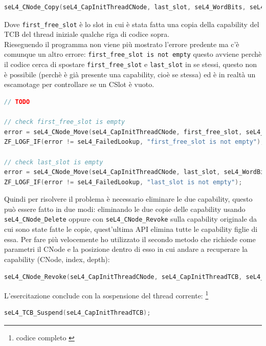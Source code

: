 \begin{lstlisting}[language=C++]
seL4_CNode_Copy(seL4_CapInitThreadCNode, last_slot, seL4_WordBits, seL4_CapInitThreadCNode, first_free_slot, seL4_WordBits, seL4_AllRights);
\end{lstlisting}
Dove \texttt{first\_free\_slot} è lo slot in cui è stata fatta una copia della capability del TCB del thread iniziale qualche riga di codice sopra.\\
Rieseguendo il programma non viene più mostrato l'errore predente ma c'è comunque un altro errore: \texttt{first\_free\_slot is not empty} questo avviene perchè il codice cerca di spostare \texttt{first\_free\_slot} e \texttt{last\_slot} in se stessi, questo non è possibile (perchè è già presente una capability, cioè se stessa) ed è in realtà un escamotage per controllare se un CSlot è vuoto.
\begin{lstlisting}[language=C++]
// TODO 
         
// check first_free_slot is empty
error = seL4_CNode_Move(seL4_CapInitThreadCNode, first_free_slot, seL4_WordBits, seL4_CapInitThreadCNode, first_free_slot, seL4_WordBits);
ZF_LOGF_IF(error != seL4_FailedLookup, "first_free_slot is not empty");

// check last_slot is empty
error = seL4_CNode_Move(seL4_CapInitThreadCNode, last_slot, seL4_WordBits, seL4_CapInitThreadCNode, last_slot, seL4_WordBits);
ZF_LOGF_IF(error != seL4_FailedLookup, "last_slot is not empty");
\end{lstlisting}
Quindi per risolvere il problema è necessario eliminare le due capability, questo può essere fatto in due modi: eliminando le due copie delle capability usando \texttt{seL4\_CNode\_Delete} oppure con \texttt{seL4\_CNode\_Revoke} sulla capability originale da cui sono state fatte le copie, quest'ultima API elimina tutte le capability figlie di essa. Per fare più velocemente ho utilizzato il secondo metodo che richiede come parametri il CNode e la posizione dentro di esso in cui andare a recuperare la capability (CNode, index, depth):
\begin{lstlisting}[language=C++]
seL4_CNode_Revoke(seL4_CapInitThreadCNode, seL4_CapInitThreadTCB, seL4_WordBits);
\end{lstlisting}
L'esercitazione conclude con la sospensione del thread corrente: \footnote{codice completo \cite{capability}}
\begin{lstlisting}[language=C++]
seL4_TCB_Suspend(seL4_CapInitThreadTCB);
\end{lstlisting}

